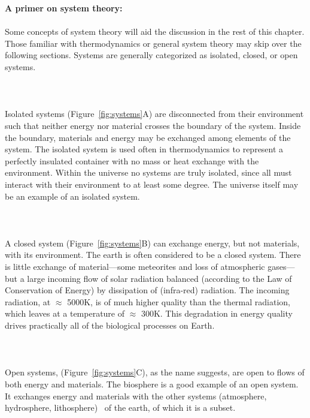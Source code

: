 \begin{svgraybox}
{\large \textbf{A primer on system theory:}}
\\\\
Some concepts of system theory will aid the discussion
in the rest of this chapter.
Those familiar with thermodynamics or general system
theory may skip over the following sections.
Systems are generally categorized as 
isolated, closed, or open systems.
\\\\
\\\\
Isolated systems (Figure~\ref{fig:systems}A)
are disconnected from their environment
such that neither energy nor material crosses the
boundary of the system.
Inside the boundary,
materials and energy may be exchanged
among elements of the system.
The isolated system is used often
in thermodynamics to represent a
perfectly insulated container with no mass or heat exchange
with the environment.
Within the universe no systems are truly isolated,
since all must interact with their environment
to at least some degree.
The universe itself may be an example of an 
isolated system.
\\\\
\\\\
A closed system (Figure~\ref{fig:systems}B)
can exchange energy, but not materials,
with its environment.
The earth is often considered to be a closed system.
There is little exchange of material---some meteorites
and loss of atmospheric gases---but a large incoming
flow of solar radiation balanced (according to the 
Law of Conservation of Energy) by dissipation of (infra-red) radiation.
The incoming radiation, at $\approx$ 5000K, is of much
higher quality than the thermal radiation, which leaves at a 
temperature of $\approx$ 300K.
This degradation in energy quality drives practically
all of the biological processes on Earth.
\\\\ 
\\\\
Open systems, (Figure~\ref{fig:systems}C),
as the name suggests, are open
to flows of both energy and materials.
The biosphere is a good example of an open system.
It exchanges energy and materials with the other systems
(atmosphere, hydrosphere, lithosphere)~\cite{Johnson1997}
of the earth, of which it is a subset.

\end{svgraybox}
